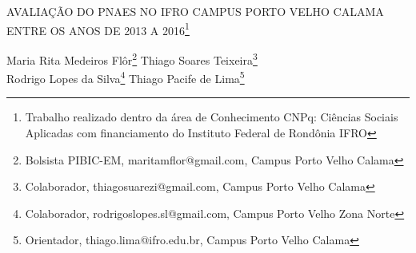 \documentclass[article,12pt,onesidea,4paper,english,brazil]{abntex2}
\begin{document}
	
	
	\frenchspacing 
	
	\begin{center}
		\LARGE AVALIAÇÃO DO PNAES NO IFRO CAMPUS PORTO VELHO CALAMA ENTRE OS ANOS DE 2013 A 2016\footnote{Trabalho realizado dentro da área de Conhecimento CNPq: Ciências Sociais Aplicadas com financiamento do Instituto Federal de Rondônia IFRO}
		
		\normalsize
		Maria Rita Medeiros Flôr\footnote{Bolsista PIBIC-EM, maritamflor@gmail.com, Campus Porto Velho Calama} 
		Thiago Soares Teixeira\footnote{Colaborador, thiagosuarezi@gmail.com, Campus Porto Velho Calama} \\
		Rodrigo Lopes da Silva\footnote{Colaborador, rodrigoslopes.sl@gmail.com, Campus Porto Velho Zona Norte} 
		Thiago Pacife de Lima\footnote{Orientador, thiago.lima@ifro.edu.br, Campus Porto Velho Calama} 
	\end{center}
	
\end{document}
